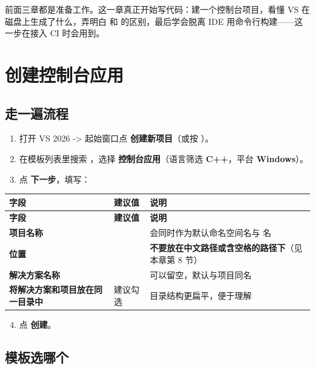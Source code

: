 
前面三章都是准备工作。这一章真正开始写代码：建一个控制台项目，看懂 VS 在磁盘上生成了什么，弄明白  和  的区别，最后学会脱离 IDE 用命令行构建——这一步在接入 CI 时会用到。

\section{创建控制台应用}

\subsection{走一遍流程}

\begin{enumerate}
	\item 打开 VS 2026 -> 起始窗口点 \textbf{创建新项目}（或按 ）。
	\item 在模板列表里搜索 ，选择 \textbf{控制台应用}（语言筛选 \textbf{C++}，平台 \textbf{Windows}）。
	\item 点 \textbf{下一步}，填写：
\end{enumerate}

\begin{longtable}{L{4.6cm}L{3.0cm}L{7.0cm}}\toprule
\textbf{字段} & \textbf{建议值} & \textbf{说明} \\ \midrule \endfirsthead
\toprule \textbf{字段} & \textbf{建议值} & \textbf{说明} \\ \midrule \endhead
\bottomrule \endlastfoot
\textbf{项目名称} &  & 会同时作为默认命名空间名与  名 \\
\textbf{位置} &  & \textbf{不要放在中文路径或含空格的路径下}（见本章第 8 节） \\
\textbf{解决方案名称} &  & 可以留空，默认与项目同名 \\
\textbf{将解决方案和项目放在同一目录中} & 建议勾选 & 目录结构更扁平，便于理解 \\
\end{longtable}

\begin{enumerate}
	\setcounter{enumi}{3}
	\item 点 \textbf{创建}。
\end{enumerate}

\subsection{模板选哪个}


